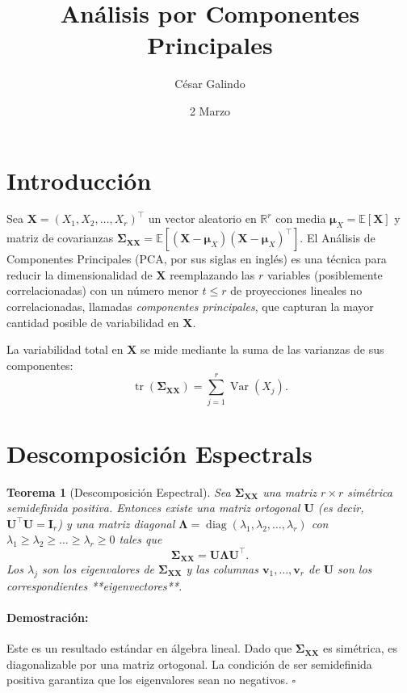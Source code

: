 \documentclass[11pt]{article}
\title{Análisis por Componentes Principales}
\author{César Galindo}
\date{2 Marzo}
\theoremstyle{plain}
\newtheorem{theorem}{Teorema}[section]
\newenvironment{proof}{\paragraph{Demostración:}}{\hfill$\square$}
\newcommand{\X}{\mathbf{X}}
\newcommand{\bfv}{\mathbf{v}}
\newcommand{\bfI}{\mathbf{I}}
\newcommand{\bfU}{\mathbf{U}}
\newcommand{\bfmu}{\boldsymbol{\mu}}
\newcommand{\bfSigma}{\boldsymbol{\Sigma}}
\newcommand{\bfLambda}{\boldsymbol{\Lambda}}
\newcommand{\R}{\mathbb{R}}
\newcommand{\E}{\mathbb{E}}
\newcommand{\Var}{\operatorname{Var}}
\newcommand{\E}{\mathbb{E}}
\newcommand{\R}{\mathbb{R}}
\begin{document}
\maketitle

\section{Introducción}

Sea \(\X = (X_1, X_2, \dots, X_r)^\top\) un vector aleatorio en \(\R^r\) con media \(\bfmu_X = \E[\X]\) y matriz de covarianzas \(\bfSigma_{\X\X} = \E[(\X - \bfmu_X)(\X - \bfmu_X)^\top]\). El Análisis de Componentes Principales (PCA, por sus siglas en inglés) es una técnica para reducir la dimensionalidad de \(\X\) reemplazando las \(r\) variables (posiblemente correlacionadas) con un número menor \(t \le r\) de proyecciones lineales no correlacionadas, llamadas \textit{componentes principales}, que capturan la mayor cantidad posible de variabilidad en \(\X\).

La variabilidad total en \(\X\) se mide mediante la suma de las varianzas de sus componentes:
\[
\operatorname{tr}(\bfSigma_{\X\X}) = \sum_{j=1}^r \Var(X_j).
\]

\section{Descomposición Espectrals}

\begin{theorem}[Descomposición Espectral]
\label{thm:spectral}
Sea \(\bfSigma_{\X\X}\) una matriz \(r \times r\) simétrica semidefinida positiva. Entonces existe una matriz ortogonal \(\bfU\) (es decir, \(\bfU^\top \bfU = \bfI_r\)) y una matriz diagonal \(\bfLambda = \operatorname{diag}(\lambda_1, \lambda_2, \dots, \lambda_r)\) con \(\lambda_1 \ge \lambda_2 \ge \dots \ge \lambda_r \ge 0\) tales que
\[
\bfSigma_{\X\X} = \bfU \bfLambda \bfU^\top.
\]
Los \(\lambda_j\) son los eigenvalores de \(\bfSigma_{\X\X}\) y las columnas \(\bfv_1, \dots, \bfv_r\) de \(\bfU\) son los correspondientes **eigenvectores**.
\end{theorem}

\begin{proof}
Este es un resultado estándar en álgebra lineal. Dado que \(\bfSigma_{\X\X}\) es simétrica, es diagonalizable por una matriz ortogonal. La condición de ser semidefinida positiva garantiza que los eigenvalores sean no negativos.
\end{proof}
\end{document}
